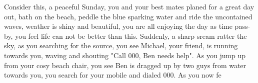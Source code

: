 Consider this, a peaceful Sunday, you and your best mates planed for a great day out, bath on the beach, peddle the blue sparking water and ride the uncontained waves, weather is shiny and beautiful, you are all enjoying the day as time pass-by, you feel life can not be better than this. Suddenly, a sharp sream ratter the sky, as you searching for the source, you see Michael, your friend, is running towards you, waving and shouting "Call 000, Ben needs help". As you jump up from your cosy beach chair, you see Ben is dragged up by two guys from water towards you, you search for your mobile and dialed 000. As you now fe